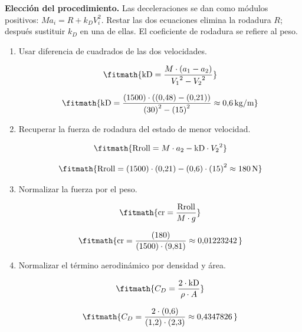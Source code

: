 \noindent\textbf{Elección del procedimiento.} Las deceleraciones se dan como módulos positivos: $Ma_i=R+k_DV_i^2$. Restar las dos ecuaciones elimina la rodadura $R$; después sustituir $k_D$ en una de ellas. El coeficiente de rodadura se refiere al peso.

\begin{enumerate}

\item Usar diferencia de cuadrados de las dos velocidades.

\[\fitmath{\mathrm{kD}=\frac{M\cdot \left(a_{1}-a_{2}\right)}{{V_{1}}^{2}-{V_{2}}^{2}}}\]

\[\fitmath{\mathrm{kD}=\frac{(1500)\cdot \left((0{,}48)-(0{,}21)\right)}{{(30)}^{2}-{(15)}^{2}}\approx 0{,}6\,\mathrm{kg/m}}\]

\item Recuperar la fuerza de rodadura del estado de menor velocidad.

\[\fitmath{\mathrm{Rroll}=M\cdot a_{2}-\mathrm{kD}\cdot {V_{2}}^{2}}\]

\[\fitmath{\mathrm{Rroll}=(1500)\cdot (0{,}21)-(0{,}6)\cdot {(15)}^{2}\approx 180\,\mathrm{N}}\]

\item Normalizar la fuerza por el peso.

\[\fitmath{\mathrm{cr}=\frac{\mathrm{Rroll}}{M\cdot g}}\]

\[\fitmath{\mathrm{cr}=\frac{(180)}{(1500)\cdot (9{,}81)}\approx 0{,}01223242\,}\]

\item Normalizar el término aerodinámico por densidad y área.

\[\fitmath{C_D=\frac{2\cdot \mathrm{kD}}{\rho\cdot A}}\]

\[\fitmath{C_D=\frac{2\cdot (0{,}6)}{(1{,}2)\cdot (2{,}3)}\approx 0{,}4347826\,}\]

\end{enumerate}
